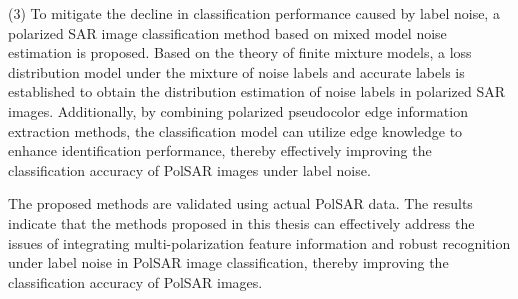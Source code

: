 \begin{englishabstract}
    (3) To mitigate the decline in classification performance caused by label noise, a polarized SAR image classification method based on mixed model noise estimation is proposed. Based on the theory of finite mixture models, a loss distribution model under the mixture of noise labels and accurate labels is established to obtain the distribution estimation of noise labels in polarized SAR images. Additionally, by combining polarized pseudocolor edge information extraction methods, the classification model can utilize edge knowledge to enhance identification performance, thereby effectively improving the classification accuracy of PolSAR images under label noise.

    The proposed methods are validated using actual PolSAR data. The results indicate that the methods proposed in this thesis can effectively address the issues of integrating multi-polarization feature information and robust recognition under label noise in PolSAR image classification, thereby improving the classification accuracy of PolSAR images.

\end{englishabstract}


